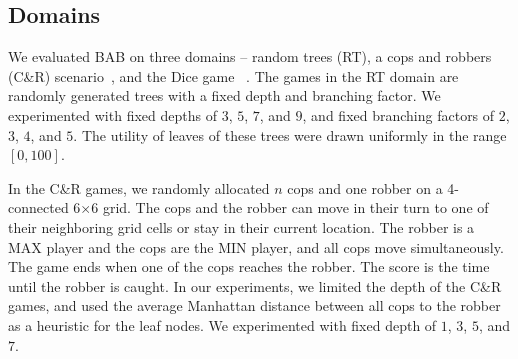 \documentclass[runningheads]{llncs}
\newcommand{\pess}{\mathit{L}}
\newcommand{\opti}{\mathit{U}}
\newcommand{\vmax}{v_{\text{max}}}
\newcommand{\vmin}{v_{\text{min}}}
\newcommand{\amb}{\mathit{AMB}}
\newcommand{\er}{\mathit{ER}}
\begin{document}



\subsection{Domains}
We evaluated BAB on three domains -- random trees (RT), a cops and robbers (C\&R) scenario~\citep{moldenhauer2009evaluating}, and the Dice game ~\citep{diceGame}. The games in the RT domain are randomly generated trees with a fixed depth and branching factor. We experimented with 
fixed depths of $3$, $5$, $7$, and $9$, and fixed branching factors of $2$, $3$, $4$, and $5$. 
The utility of leaves of these trees were drawn uniformly in the range $[0, 100]$. 

In the C\&R games, we randomly allocated $n$ cops and one robber on a 4-connected 6$\times$6 grid. The cops and the robber can move in their turn to one of their neighboring grid cells or stay in their current location. The robber is a MAX player and the cops are the MIN player, and all cops move simultaneously. The game ends when one of the cops reaches the robber. The score is the time until the robber is caught. 
In our experiments, we limited the depth of the C\&R games, and used the average Manhattan distance between all cops to the robber as a heuristic for the leaf nodes. We experimented with fixed depth of $1$, $3$, $5$, and $7$.

\end{document}
